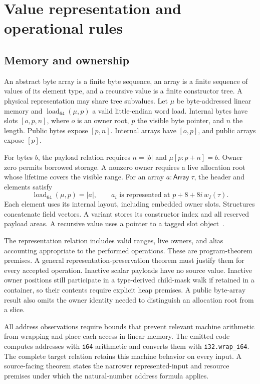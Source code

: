\documentclass[11pt]{article}
\newcommand{\code}[1]{\texttt{#1}}
\newcommand{\ty}[1]{\mathsf{#1}}
\begin{document}
\section{Value representation and operational rules}

\subsection{Memory and ownership}

An abstract byte array is a finite byte sequence, an array is a finite sequence of values of its element type, and a recursive value is a finite constructor tree.  A physical representation may share tree subvalues.  Let $\mu$ be byte-addressed linear memory and $\operatorname{load}_{64}(\mu,p)$ a valid little-endian word load.  Internal bytes have slots $[o,p,n]$, where $o$ is an owner root, $p$ the visible byte pointer, and $n$ the length.  Public bytes expose $[p,n]$.  Internal arrays have $[o,p]$, and public arrays expose $[p]$.

For bytes $b$, the payload relation requires $n=|b|$ and $\mu[p:p+n]=b$.  Owner zero permits borrowed storage.  A nonzero owner requires a live allocation root whose lifetime covers the visible range.  For an array $a:\ty{Array}\;\tau$, the header and elements satisfy
\[
\operatorname{load}_{64}(\mu,p)=|a|,
\qquad
a_i\text{ is represented at }p+8+8i\,w_I(\tau).
\]
Each element uses its internal layout, including embedded owner slots.  Structures concatenate field vectors.  A variant stores its constructor index and all reserved payload areas.  A recursive value uses a pointer to a tagged slot object~\cite{storage,values,binary}.

The representation relation includes valid ranges, live owners, and alias accounting appropriate to the performed operations.  These are program-theorem premises.  A general representation-preservation theorem must justify them for every accepted operation.  Inactive scalar payloads have no source value.  Inactive owner positions still participate in a type-derived child-mask walk if retained in a container, so their contents require explicit heap premises.  A public byte-array result also omits the owner identity needed to distinguish an allocation root from a slice.

All address observations require bounds that prevent relevant machine arithmetic from wrapping and place each access in linear memory.  The emitted code computes addresses with \code{i64} arithmetic and converts them with \code{i32.wrap\_i64}.  The complete target relation retains this machine behavior on every input.  A source-facing theorem states the narrower represented-input and resource premises under which the natural-number address formula applies.
\end{document}
